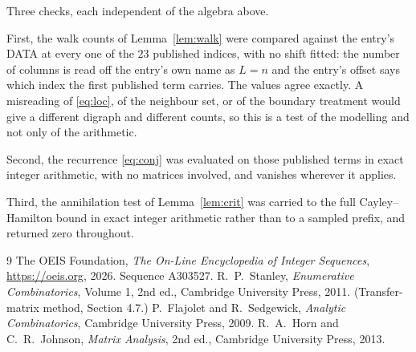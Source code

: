 \documentclass[11pt,a4paper]{article}
\theoremstyle{plain}
\theoremstyle{definition}
\begin{document}
Three checks, each independent of the algebra above.

First, the walk counts of Lemma~\ref{lem:walk} were compared against the entry's DATA at
every one of the $23$ published indices, with no shift fitted: the number of columns is
read off the entry's own name as $L=n$ and the entry's offset says which index the first
published term carries. The values agree exactly. A misreading of \eqref{eq:loc}, of the
neighbour set, or of the boundary treatment would give a different digraph and different
counts, so this is a test of the modelling and not only of the arithmetic.

Second, the recurrence \eqref{eq:conj} was evaluated on those published terms in exact
integer arithmetic, with no matrices involved, and vanishes wherever it applies.

Third, the annihilation test of Lemma~\ref{lem:crit} was carried to the full
Cayley--Hamilton bound in exact integer arithmetic rather than to a sampled prefix, and
returned zero throughout.

\begin{thebibliography}{9}
 The OEIS Foundation, \emph{The On-Line Encyclopedia of Integer
Sequences}, \url{https://oeis.org}, 2026. Sequence A303527.
 R.~P.~Stanley, \emph{Enumerative Combinatorics}, Volume 1, 2nd ed.,
Cambridge University Press, 2011. (Transfer-matrix method, Section 4.7.)
 P.~Flajolet and R.~Sedgewick, \emph{Analytic Combinatorics}, Cambridge
University Press, 2009.
 R.~A.~Horn and C.~R.~Johnson, \emph{Matrix Analysis}, 2nd ed., Cambridge
University Press, 2013.
\end{thebibliography}
\end{document}

